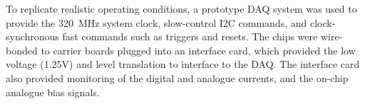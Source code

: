 To replicate realistic operating conditions, a prototype DAQ system  was used to provide the 320~MHz system clock, slow-control I2C commands, and clock-synchronous fast commands such as triggers and resets. The chips were wire-bonded to carrier boards plugged into an interface card, which provided the low voltage (1.25V) and level translation to interface to the DAQ. The interface card also provided monitoring of the digital and analogue currents, and the on-chip analogue bias signals.

